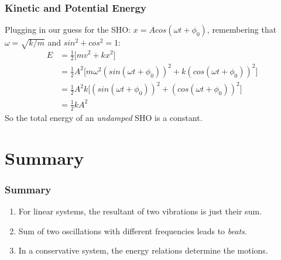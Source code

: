 \documentclass[pdf,hideothersubsections]{beamer}
\begin{document}
\begin{frame}
\frametitle{Kinetic and Potential Energy}
Plugging in our guess for the SHO: $x = A cos(\omega t + \phi_0)$,
remembering that $\omega = \sqrt{k/m}$ and $sin^2 + cos^2 = 1$:
\begin{align*}
E  &= \frac{1}{2} \Big[ m v^2 + k x^2 \Big]             \\
   &= \frac{1}{2} A^2 \Big[m \omega^2 (sin(\omega t + \phi_0))^2 + k (cos(\omega t + \phi_0))^2 \Big]   \\
   &= \frac{1}{2} A^2 k \Big[(sin(\omega t + \phi_0))^2 + (cos(\omega t + \phi_0))^2 \Big]   \\
   &= \frac{1}{2} k A^2
\end{align*}
So the total energy of an \emph{undamped} SHO is a constant\footnotemark.


\end{frame}







\section{Summary}
\begin{frame}
\frametitle{Summary}
\begin{enumerate}
\pause
\item For linear systems, the resultant of two vibrations is just their sum.
\pause
\item Sum of two oscillations with different frequencies leads to \emph{beats}.
\pause
\item In a conservative system, the energy relations determine the
  motions.
\end{enumerate}
\end{frame}
\end{document}
